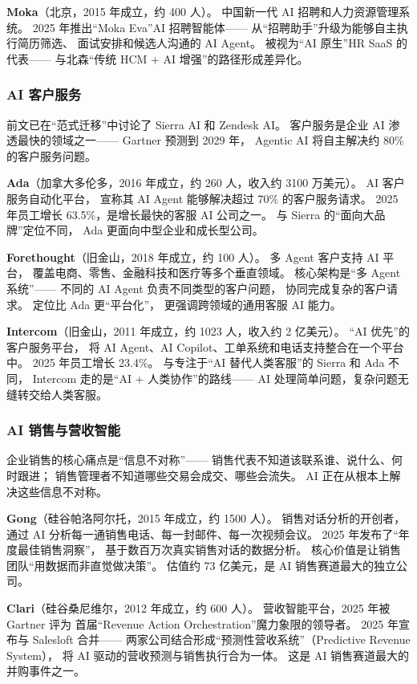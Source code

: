 \textbf{Moka}（北京，2015 年成立，约 400 人）。
中国新一代 AI 招聘和人力资源管理系统。
2025 年推出``Moka Eva''AI 招聘智能体——
从``招聘助手''升级为能够自主执行简历筛选、
面试安排和候选人沟通的 AI Agent。
被视为``AI 原生''HR SaaS 的代表——
与北森``传统 HCM + AI 增强''的路径形成差异化。

\subsubsection{AI 客户服务}

前文已在``范式迁移''中讨论了 Sierra AI 和 Zendesk AI。
客户服务是企业 AI 渗透最快的领域之一——
Gartner 预测到 2029 年，
Agentic AI 将自主解决约 80\% 的客户服务问题。

\textbf{Ada}（加拿大多伦多，2016 年成立，约 260 人，收入约 3100 万美元）。
AI 客户服务自动化平台，
宣称其 AI Agent 能够解决超过 70\% 的客户服务请求。
2025 年员工增长 63.5\%，是增长最快的客服 AI 公司之一。
与 Sierra 的``面向大品牌''定位不同，
Ada 更面向中型企业和成长型公司。

\textbf{Forethought}（旧金山，2018 年成立，约 100 人）。
多 Agent 客户支持 AI 平台，
覆盖电商、零售、金融科技和医疗等多个垂直领域。
核心架构是``多 Agent 系统''——
不同的 AI Agent 负责不同类型的客户问题，
协同完成复杂的客户请求。
定位比 Ada 更``平台化''，
更强调跨领域的通用客服 AI 能力。

\textbf{Intercom}（旧金山，2011 年成立，约 1023 人，收入约 2 亿美元）。
``AI 优先''的客户服务平台，
将 AI Agent、AI Copilot、工单系统和电话支持整合在一个平台中。
2025 年员工增长 23.4\%。
与专注于``AI 替代人类客服''的 Sierra 和 Ada 不同，
Intercom 走的是``AI + 人类协作''的路线——
AI 处理简单问题，复杂问题无缝转交给人类客服。

\subsubsection{AI 销售与营收智能}

企业销售的核心痛点是``信息不对称''——
销售代表不知道该联系谁、说什么、何时跟进；
销售管理者不知道哪些交易会成交、哪些会流失。
AI 正在从根本上解决这些信息不对称。

\textbf{Gong}（硅谷帕洛阿尔托，2015 年成立，约 1500 人）。
销售对话分析的开创者，
通过 AI 分析每一通销售电话、每一封邮件、每一次视频会议。
2025 年发布了``年度最佳销售洞察''，
基于数百万次真实销售对话的数据分析。
核心价值是让销售团队``用数据而非直觉做决策''。
估值约 73 亿美元，是 AI 销售赛道最大的独立公司。

\textbf{Clari}（硅谷桑尼维尔，2012 年成立，约 600 人）。
营收智能平台，2025 年被 Gartner 评为
首届``Revenue Action Orchestration''魔力象限的领导者。
2025 年宣布与 Salesloft 合并——
两家公司结合形成``预测性营收系统''（Predictive Revenue System），
将 AI 驱动的营收预测与销售执行合为一体。
这是 AI 销售赛道最大的并购事件之一。

